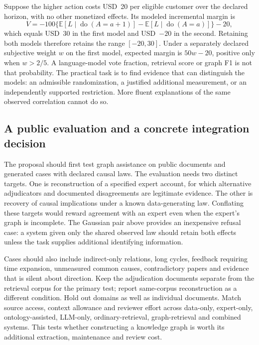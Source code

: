 Suppose the higher action costs USD~20 per eligible customer over the declared
horizon, with no other monetized effects. Its modeled incremental margin is
\begin{equation}
 V=-100\{\mathbb E[L\mid\operatorname{do}(A=a+1)]
             -\mathbb E[L\mid\operatorname{do}(A=a)]\}-20,
 \label{exec22:domain-margin}
\end{equation}
which equals USD~30 in the first model and USD~\(-20\) in the second. Retaining
both models therefore retains the range \([-20,30]\). Under a separately declared
subjective weight \(w\) on the first model, expected margin is \(50w-20\),
positive only when \(w>2/5\). A language-model vote fraction, retrieval score or
graph F1 is not that probability. The practical task is to find evidence that
can distinguish the models: an admissible randomization, a justified additional
measurement, or an independently supported restriction. More fluent explanations
of the same observed correlation cannot do so. \cite{exec22_domain_reference}

\subsection{A public evaluation and a concrete integration decision}
\label{exec22:domain-validation}

The proposal should first test graph assistance on public documents and generated
cases with declared causal laws. The evaluation needs two distinct targets.
One is reconstruction of a specified expert account, for which alternative
adjudicators and documented disagreements are legitimate evidence. The other is
recovery of causal implications under a known data-generating law. Conflating
these targets would reward agreement with an expert even when the expert's graph
is incomplete. The Gaussian pair above provides an inexpensive refusal case:
a system given only the shared observed law should retain both effects unless
the task supplies additional identifying information.

Cases should also include indirect-only relations, long cycles, feedback requiring
time expansion, unmeasured common causes, contradictory papers and evidence that
is silent about direction. Keep the adjudication documents separate from the
retrieval corpus for the primary test; report same-corpus reconstruction as a
different condition. Hold out domains as well as individual documents. Match
source access, context allowance and reviewer effort across data-only,
expert-only, ontology-assisted, LLM-only, ordinary-retrieval, graph-retrieval and
combined systems. This tests whether constructing a knowledge graph is worth its
additional extraction, maintenance and review cost.

